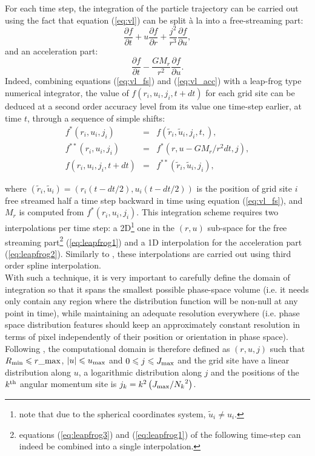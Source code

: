 \documentclass[useAMS,usenatbib]{mn2e}
\newcommand{\rtilde}{\tilde{r}}
\newcommand{\utilde}{\tilde{u}}
\begin{document}
 For each time step, the integration of the particle trajectory can be carried out using the fact that equation (\ref{eq:vl}) can be split \`{a} la \cite{CK} into a free-streaming part:
\begin{equation}
\frac{\partial f}{\partial t}+u\frac{\partial f}{\partial r}+\frac{j^2}{r^3}\frac{\partial f}{\partial u},
\label{eq:vl_fs}
\end{equation}
and an acceleration part:
\begin{equation}
\frac{\partial f}{\partial t}-\frac{GM_r}{r^2}\frac{\partial f}{\partial u}.
\label{eq:vl_acc}
\end{equation}
Indeed, combining equations (\ref{eq:vl_fs}) and (\ref{eq:vl_acc}) with a leap-frog type numerical integrator, the value of $f\left(r_i,u_i,j_i,t+dt\right)$ for each grid site can be deduced at a second order accuracy level from its value one time-step earlier, at time $t$, through a sequence of simple shifts:
\begin{eqnarray}
f^*\left(r_i,u_i,j_i\right) &=& f\left(\rtilde_i,\utilde_i,j_i,t,\right), \label{eq:leapfrog1}\\
f^{**}\left(r_i,u_i,j_i\right) &=& f^*\left(r,u-{GM_r}/{r^2}dt,j\right), \label{eq:leapfrog2}\\
f\left(r_i,u_i,j_i,t+dt\right) &=& f^{**}\left(\rtilde_i,\utilde_i,j_i\right), \label{eq:leapfrog3}
\end{eqnarray}

where $\left(\rtilde_i,\utilde_i\right)=\left(r_i\left(t-dt/2\right),u_i\left(t-dt/2\right)\right)$ is the position of grid site $i$ free streamed half a time step backward in time using equation (\ref{eq:vl_fs}), and $M_r$ is computed from $f^*\left(r_i,u_i,j_i\right)$. This integration scheme requires two interpolations per time step: a 2D\footnote{note that due to the spherical coordinates system, $\utilde_i \neq u_i$.} one in the $\left(r,u\right)$ sub-space for the free streaming part\footnote{equations (\ref{eq:leapfrog3}) and (\ref{eq:leapfrog1}) of the following time-step can indeed be combined into a single interpolation.} (\ref{eq:leapfrog1}) and a 1D interpolation for the acceleration part (\ref{eq:leapfrog2}). Similarly to \cite{Fuji83}, these interpolations are carried out using third order spline interpolation.\\

With such a technique, it is very important to carefully define the domain of integration so that it spans the smallest possible phase-space volume (i.e. it needs only contain any region where the distribution function will be non-null at any point in time), while maintaining an adequate resolution everywhere (i.e. phase space distribution features should keep an approximately constant resolution in terms of pixel independently of their position or orientation in phase space). Following \cite{Fuji83}, the computational domain is therefore defined as $\left(r,u,j\right)$ such that $R_{\rm min}\leq r\_{\rm max}$, $\left|u\right|\leq u_{\rm max}$ and $0\leq j \leq J_{\rm max}$ and the grid site have a linear distribution along $u$, a logarithmic distribution along $j$ and the positions of the $k^{\rm th}$ angular momentum site is $j_k=k^2\left(J_{\rm max}/{N_k}^2\right)$.\\
\end{document}
